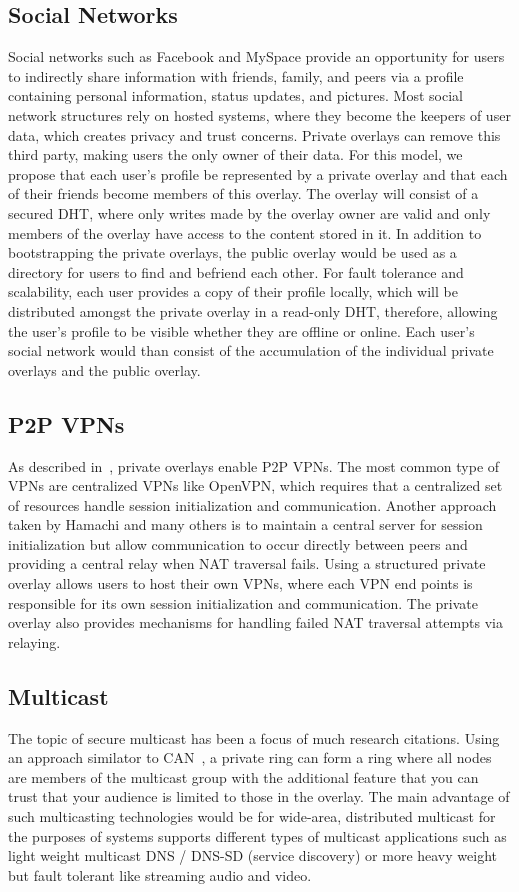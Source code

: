 \documentclass[conference]{IEEEtran}
\begin{document}
\subsection{Social Networks}
Social networks such as Facebook and MySpace provide an opportunity for users to
indirectly share information with friends, family, and peers via a profile
containing personal information, status updates, and pictures.
Most social network structures rely on hosted systems, where they become
the keepers of user data, which creates privacy and trust concerns.  Private overlays
can remove this third party, making users the only owner of their data.  For this
model, we propose that each user's profile be represented by a private overlay
and that each of their friends become members of this overlay.  The overlay will
consist of a secured DHT, where only writes made by the overlay owner are valid
and only members of the overlay have access to the content stored in it.  In
addition to bootstrapping the private overlays, the public overlay would be
used as a directory for users to find and befriend each other.  For fault
tolerance and scalability, each user provides a copy of their profile
locally, which will be distributed amongst the private overlay in a read-only
DHT, therefore, allowing the user's profile to be visible whether they are
offline or online.  Each user's social network would than consist of the
accumulation of the individual private overlays and the public overlay.

\subsection{P2P VPNs}
As described in~\cite{nsdi10}, private overlays enable P2P VPNs.  The most
common type of VPNs are centralized VPNs like OpenVPN, which requires that a
centralized set of resources handle session initialization and communication.
Another approach taken by Hamachi and many others is to maintain a central
server for session initialization but allow communication to occur directly
between peers and providing a central relay when NAT traversal fails.  Using
a structured private overlay allows users to host their own VPNs, where each
VPN end points is responsible for its own session initialization and
communication.  The private overlay also provides mechanisms for handling
failed NAT traversal attempts via relaying.

\subsection{Multicast}
The topic of secure multicast has been a focus of much research citations.
Using an approach similator to CAN~\cite{can_multicast}, a private ring can form
a ring where all nodes are members of the multicast group with the additional
feature that you can trust that your audience is limited to those in the
overlay.  The main advantage of such multicasting technologies would be for
wide-area, distributed multicast for the purposes of systems supports different
types of multicast applications such as light weight multicast DNS / DNS-SD
(service discovery) or more heavy weight but fault tolerant like streaming
audio and video.
\end{document}
